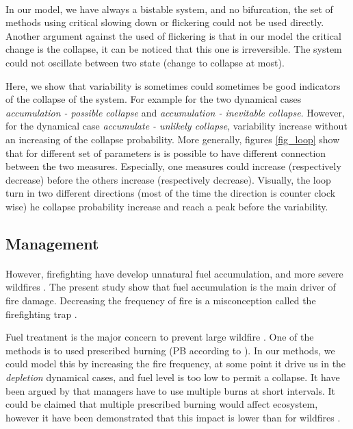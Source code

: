 \documentclass{article}
\begin{document}
\paragraph{}
In our model, we have always a bistable system, and no bifurcation, the set of methods using critical slowing down or flickering could not be used directly. Another argument against the used of flickering is that in our model the critical change is the collapse, it can be noticed that this one is irreversible. The system could not oscillate between two state (change to collapse at most).

Here, we show that variability is sometimes could sometimes be good indicators of the collapse of the system. For example for the two dynamical cases \textit{accumulation - possible collapse} and \textit{accumulation - inevitable collapse}. However, for the dynamical case \textit{accumulate - unlikely collapse}, variability increase without an increasing of the collapse probability. More generally, figures \ref{fig_loop} show that for different set of parameters is is possible to have different connection between the two measures. Especially, one measures could increase (respectively decrease) before the others increase (respectively decrease). Visually, the loop turn in two different directions (most of the time the direction is counter clock wise) he collapse probability increase and reach a peak before the variability.







\subsection{Management}

\paragraph{}
However, firefighting have develop unnatural fuel accumulation, and more severe wildfires \citep{schoennagel_interaction_2004}. The present study show that fuel accumulation is the main driver of fire damage. Decreasing the frequency of fire is a misconception called the firefighting trap \citep{collins_forest_2013}.

Fuel treatment is the major concern to prevent large wildfire \citep{liu_studying_2013, martinson_performance_nodate}. One of the methods is to used prescribed burning (PB according to \cite{liu_analyzing_2010}). In our methods, we could model this by increasing the fire frequency, at some point it drive us in the \textit{depletion} dynamical cases, and fuel level is too low to permit a collapse. It have been argued by \cite{scholl_fire_2010} that managers have to use multiple burns at short intervals. It could be claimed that multiple prescribed burning would affect ecosystem, however it have been demonstrated that this impact is lower than for wildfires \citep{alcaniz2018effects, fultz2016forest, wiedinmyer2010prescribed}. 
\end{document}
